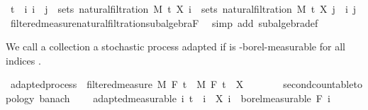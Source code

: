 \begin{isabellebody}
\ {\isachardoublequoteopen}{\isasymlbrakk}t\ {\isasymle}\ i{\isacharsemicolon}{\kern0pt}\ i\ {\isasymle}\ j{\isasymrbrakk}\ {\isasymLongrightarrow}\ sets\ {\isacharparenleft}{\kern0pt}natural{\isacharunderscore}{\kern0pt}filtration\ M\ t\ X\ i{\isacharparenright}{\kern0pt}\ {\isasymsubseteq}\ sets\ {\isacharparenleft}{\kern0pt}natural{\isacharunderscore}{\kern0pt}filtration\ M\ t\ X\ j{\isacharparenright}{\kern0pt}{\isachardoublequoteclose}\ \ i\ j\ \isamarkupfalse%
\ filtered{\isacharunderscore}{\kern0pt}measure{\isacharunderscore}{\kern0pt}natural{\isacharunderscore}{\kern0pt}filtration{\isachardot}{\kern0pt}subalgebra{\isacharunderscore}{\kern0pt}F\ \isamarkupfalse%
\ {\isacharparenleft}{\kern0pt}simp\ add{\isacharcolon}{\kern0pt}\ subalgebra{\isacharunderscore}{\kern0pt}def{\isacharparenright}{\kern0pt}\isanewline
{}\isamarkupfalse%
%
\endisatagproof
{\isafoldproof}%
%
\isadelimproof
%
\endisadelimproof
%
\isadelimdocument
%
\endisadelimdocument
%
\isatagdocument
%
\isamarkuptrue%
%
\endisatagdocument
{\isafolddocument}%
%
\isadelimdocument
%
\endisadelimdocument
%
\begin{isamarkuptext}%
We call a collection a stochastic process  adapted if  is -borel-measurable for all indices .%
\end{isamarkuptext}\isamarkuptrue%
\isamarkupfalse%
\ adapted{\isacharunderscore}{\kern0pt}process\ {\isacharequal}{\kern0pt}\ filtered{\isacharunderscore}{\kern0pt}measure\ M\ F\ t\ \ M\ F\ t\ \ X\ {\isacharcolon}{\kern0pt}{\isacharcolon}{\kern0pt}\ {\isachardoublequoteopen}{\isacharunderscore}{\kern0pt}\ {\isasymRightarrow}\ {\isacharunderscore}{\kern0pt}\ {\isasymRightarrow}\ {\isacharunderscore}{\kern0pt}\ {\isacharcolon}{\kern0pt}{\isacharcolon}{\kern0pt}\ {\isacharbraceleft}{\kern0pt}second{\isacharunderscore}{\kern0pt}countable{\isacharunderscore}{\kern0pt}topology{\isacharcomma}{\kern0pt}\ banach{\isacharbraceright}{\kern0pt}{\isachardoublequoteclose}\ {\isacharplus}{\kern0pt}\isanewline
\ \ \ adapted{\isacharbrackleft}{\kern0pt}measurable{\isacharbrackright}{\kern0pt}{\isacharcolon}{\kern0pt}\ {\isachardoublequoteopen}{\isasymAnd}i{\isachardot}{\kern0pt}\ t\ {\isasymle}\ i\ {\isasymLongrightarrow}\ X\ i\ {\isasymin}\ borel{\isacharunderscore}{\kern0pt}measurable\ {\isacharparenleft}{\kern0pt}F\ i{\isacharparenright}{\kern0pt}{\isachardoublequoteclose}\isanewline

\end{isabellebody}
